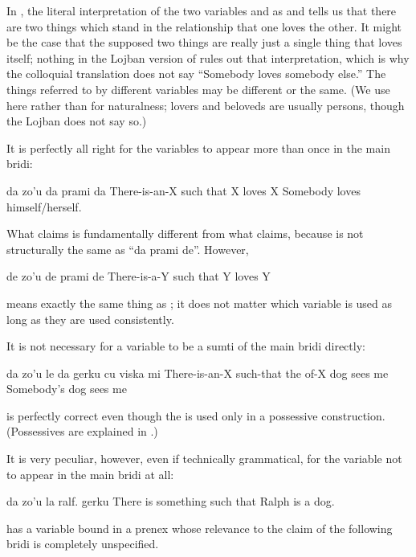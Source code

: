 In , the literal interpretation
    of the two variables  and  as  and
     tells us that there are two things which stand
    in the relationship that one loves the other. It might be the
    case that the supposed two things are really just a single
    thing that loves itself; nothing in the Lojban version of  rules out that interpretation,
    which is why the colloquial translation does not say ``Somebody
    loves somebody else.'' The things referred to by different
    variables may be different or the same. (We use 
    here rather than  for naturalness; lovers and
    beloveds are usually persons, though the Lojban does not say
    so.) 

It is perfectly all right for the variables to appear more
    than once in the main bridi:
\begin{example}
da zo'u da prami da\n
There-is-an-X such that X loves X\n
Somebody loves himself/herself.
\end{example}

What  claims is fundamentally
    different from what  claims,
    because  is not structurally the same as ``da
    prami de''. However,
\begin{example}
de zo'u de prami de\n
There-is-a-Y such that Y loves Y
\end{example}

{\noindent}means exactly the same thing as ; it does not matter which variable is used as long as
    they are used consistently. 

It is not necessary for a variable to be a sumti of the main
    bridi directly:
\begin{example}
da zo'u le da gerku cu viska mi\n
There-is-an-X such-that the of-X dog sees me\n
Somebody's dog sees me
\end{example}

{\noindent}is perfectly correct even though the  is used only in a
    possessive construction. (Possessives are explained in .) 

It is very peculiar, however, even if technically
    grammatical, for the variable not to appear in the main bridi
    at all:
\begin{example}
da zo'u la ralf. gerku\n
There is something such that Ralph is a dog.
\end{example}

{\noindent}has a variable bound in a prenex whose relevance to the claim
    of the following bridi is completely unspecified.



